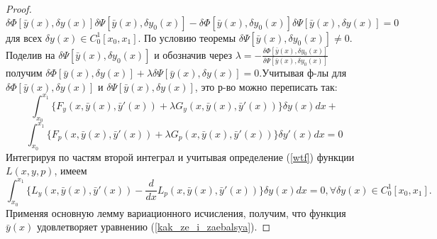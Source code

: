 \documentclass{article}
\begin{document}
\begin{proof}
    $$\delta \Phi[\bar y(x), \delta y(x)]\delta \Psi[\bar y(x), \delta y_0(x)] - \delta \Phi[\bar y(x), \delta y_0(x)]\delta\Psi[\bar y(x), \delta y(x)] = 0$$
    для всех $\delta y(x) \in C^1_0[x_0, x_1]$. По условию теоремы $\delta\Psi[\bar y(x), \delta y_0(x)] \neq 0$. Поделив на $\delta \Psi[\bar y(x), \delta y_0(x)]$ и обозначив через $\lambda=-\frac{\delta\Phi[\bar y(x), \delta y_0(x)]}{\delta\Psi[\bar y(x), \delta y_0(x)]}$ получим $\delta\Phi[\bar y(x), \delta y(x)] + \lambda\delta\Psi[\bar y(x), \delta y(x)] = 0$.Учитывая ф-лы для $\delta\Phi[\bar y(x),\delta y(x)]$ и $\delta\Psi[\bar y(x), \delta y(x)]$, это р-во можно переписать так:
    $$\int_{x_0}^{x_1}\Big\{ F_y(x, \bar y(x), \bar y'(x)) + \lambda G_y(x, \bar y(x), \bar y'(x))\Big\}\delta y(x)dx+$$
    $$\int_{x_0}^{x_1}\Big\{ F_p(x, \bar y(x), \bar y'(x)) + \lambda G_p(x, \bar y(x), \bar y'(x))\Big\}\delta y'(x)dx=0$$
    Интегрируя по частям второй интеграл и учитывая определение (\ref{wtf}) функции $L(x, y, p)$, имеем
    $$\int_{x_0}^{x_1} \Big\{ L_y(x,\bar y(x),\bar y'(x)) - \frac{d}{dx} L_p(x,\bar y(x),\bar y'(x))\Big\}\delta y(x)dx = 0, \forall\delta y(x) \in C^1_0[x_0, x_1].$$
    Применяя основную лемму вариационного исчисления, получим, что функция $\bar y(x)$ удовлетворяет уравнению (\ref{kak_ze_i_zaebalsya}).
    
\end{proof}
\end{document}
